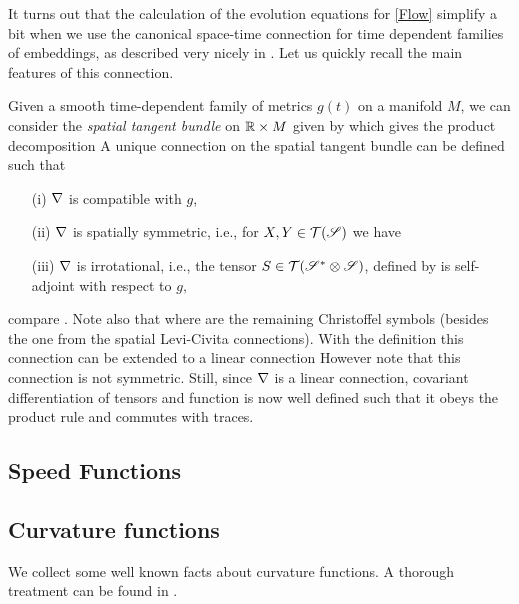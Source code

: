 It turns out that the calculation of the evolution equations for \eqref{Flow} simplify a bit when we use the canonical space-time connection for time dependent families of embeddings, as described very nicely in \cite[Sec.~6.3]{AndrewsHopper:/2011}. Let us quickly recall the main features of this connection. 

Given a smooth time-dependent family of metrics $g(t)$ on a manifold $M$, we can consider the {\it{spatial tangent bundle}} on $\mathbb{R}\times M$ given by
which gives the product decomposition
A unique connection 
 on the spatial tangent bundle can be defined such that
\begin{itemize}
\item[(i)] $\nabla$ is compatible with $g$,
\item[(ii)] $\nabla$ is spatially symmetric, i.e., for $X,Y\in \mathcal{T}(\mathscr{S})$ we have
\item[(iii)] $\nabla$ is irrotational, i.e., the tensor $S\in \mathcal{T}(\mathscr{S}^{*}\otimes \mathscr{S})$, defined by
is self-adjoint with respect to $g,$
\end{itemize}
compare \cite[Thm.~6.9]{AndrewsHopper:/2011}. Note also that 
where 
are the remaining Christoffel symbols (besides the one from the spatial Levi-Civita connections).
With the definition
this connection can be extended to a linear connection
However note that this connection is not symmetric. Still, since $\nabla$ is a linear connection, covariant differentiation of tensors and function is now well defined such that it obeys the product rule and commutes with traces.


\subsection{Speed Functions}
\label{subsec:bg_speed}

\subsection*{Curvature functions}
We collect some well known facts about curvature functions. A thorough treatment can be found in \cite[Ch.~2]{Gerhardt:/2006}.

